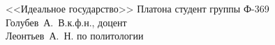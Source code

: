 


\usepackage{color}
\usepackage[colorlinks,linkcolor=black,filecolor=blue,citecolor=blue]{hyperref}


    {<<Идеальное государство>> Платона}
    {студент группы Ф-369\\Голубев~А.~В.}{к.ф.н., доцент\\Леонтьев~А.~Н.}
    {по политологии}
        
    \tableofcontents
    \thispagestyle{empty}
    \newpage
    

